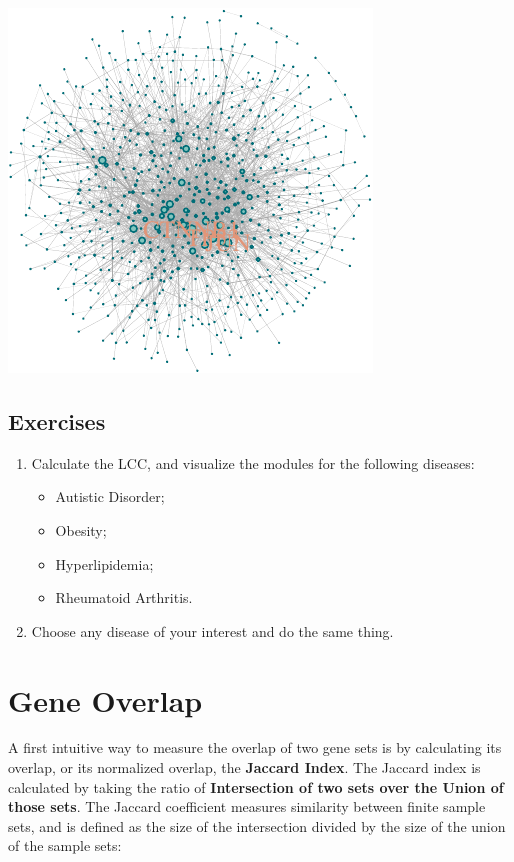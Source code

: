\documentclass[
]{book}
\providecommand{\tightlist}{%
  \setlength{\itemsep}{0pt}\setlength{\parskip}{0pt}}
\begin{document}
\includegraphics{NetMed_files/figure-latex/unnamed-chunk-25-1.pdf}

\hypertarget{exercises-3}{%
\subsection{Exercises}\label{exercises-3}}

\begin{enumerate}
\def\labelenumi{\arabic{enumi}.}
\item
  Calculate the LCC, and visualize the modules for the following diseases:

  \begin{itemize}
  \tightlist
  \item
    Autistic Disorder;
  \item
    Obesity;
  \item
    Hyperlipidemia;
  \item
    Rheumatoid Arthritis.
  \end{itemize}
\item
  Choose any disease of your interest and do the same thing.
\end{enumerate}

\hypertarget{gene-overlap}{%
\section{Gene Overlap}\label{gene-overlap}}

A first intuitive way to measure the overlap of two gene sets is by calculating its overlap, or its normalized overlap, the \textbf{Jaccard Index}. The Jaccard index is calculated by taking the ratio of \textbf{Intersection of two sets over the Union of those sets}. The Jaccard coefficient measures similarity between finite sample sets, and is defined as the size of the intersection divided by the size of the union of the sample sets:
\end{document}
